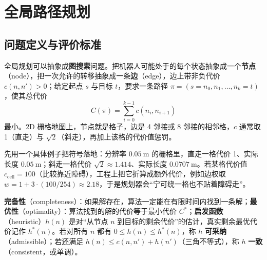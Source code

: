 \chapter{全局路径规划}\label{ch:19-global-planning}

\usetikzlibrary{arrows.meta,positioning,calc,fit,patterns,decorations.pathreplacing}


\section{问题定义与评价标准}\label{sec:19-problem}

全局规划可以抽象成\textbf{图搜索}问题。把机器人可能处于的每个状态抽象成一个\textbf{节点}（node），把一次允许的转移抽象成一条\textbf{边}（edge），边上带非负代价 $c(n,n')>0$；给定起点 $s$ 与目标 $t$，要求一条路径 $\pi=(s=n_0,n_1,\dots,n_k=t)$，使其总代价
\begin{equation}
  C(\pi)=\sum_{i=0}^{k-1} c(n_i,n_{i+1})
  \label{eq:19-pathcost}
\end{equation}
最小。2D 栅格地图上，节点就是格子，边是 4 邻接或 8 邻接的相邻格，$c$ 通常取 1（直走）与 $\sqrt2$（斜走），再加上该格的代价值惩罚。

先用一个具体例子把符号落地：分辨率 $0.05\ \mathrm{m}$ 的栅格里，直走一格代价 1、实际长度 $0.05\ \mathrm{m}$；斜走一格代价 $\sqrt2\approx1.414$、实际长度 $0.0707\ \mathrm{m}$。若某格代价值 $c_{\mathrm{cell}}=100$（比较靠近障碍），工程上把它折算成额外代价，例如边权取 $w=1+3\cdot(100/254)\approx2.18$，于是规划器会“宁可绕一格也不贴着障碍走”。

\begin{definition}
\textbf{完备性}（completeness）：如果解存在，算法一定能在有限时间内找到一条解；\textbf{最优性}（optimality）：算法找到的解的代价等于最小代价 $C^*$；\textbf{启发函数}（heuristic）$h(n)$ 是对“从节点 $n$ 到目标的剩余代价”的估计，真实剩余最优代价记作 $h^*(n)$。若对所有 $n$ 都有 $0\le h(n)\le h^*(n)$，称 $h$ \textbf{可采纳}（admissible）；若还满足 $h(n)\le c(n,n')+h(n')$（三角不等式），称 $h$ \textbf{一致}（consistent，或单调）。
\end{definition}

